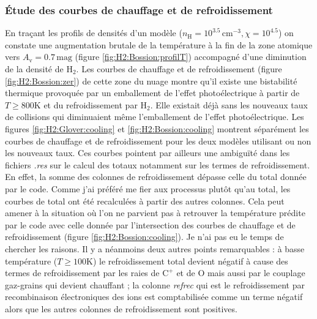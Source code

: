 \subsubsection{Étude des courbes de chauffage et de refroidissement}

En traçant les profils de densités d'un modèle ($n_\mathrm{H} = 10^{3.5}\,\mathrm{cm}^{-3},\chi = 10^{4.5}$) on constate une augmentation brutale de la température à la fin de la zone atomique vers $A_\mathrm{v}=0.7\,\mathrm{mag}$ (figure \ref{fig:H2:Bossion:profilT}) accompagné d'une diminution de la densité de $\mathrm{H}_2$. Les courbes de chauffage et de refroidissement (figure \ref{fig:H2:Bossion:zer}) de cette zone du nuage montre qu'il existe une bistabilité thermique provoquée par un emballement de l'effet photoélectrique à partir de $T\geq800$K et du refroidissement par $\mathrm{H}_2$. Elle existait déjà sans les nouveaux taux de collisions qui diminuaient même l'emballement de l'effet photoélectrique. Les figures \ref{fig:H2:Glover:cooling} et \ref{fig:H2:Bossion:cooling} montrent séparément les courbes de chauffage et de refroidissement pour les deux modèles utilisant ou non les nouveaux taux. Ces courbes pointent par ailleurs une ambiguïté dans les fichiers \textit{.res} sur le calcul des totaux notamment sur les termes de refroidissement. En effet, la somme des colonnes de refroidissement dépasse celle du total donnée par le code. Comme j'ai préféré me fier aux processus plutôt qu'au total, les courbes de total ont été recalculées à partir des autres colonnes. Cela peut amener à la situation où l'on ne parvient pas à retrouver la température prédite par le code avec celle donnée par l'intersection des courbes de chauffage et de refroidissement (figure \ref{fig:H2:Bossion:cooling}). Je n'ai pas eu le temps de chercher les raisons. Il y a néanmoins deux autres points remarquables : à basse température ($T\geq 100$K) le refroidissement total devient négatif à cause des termes de refroidissement par les raies de $\mathrm{C}^+$ et de $\mathrm{O}$ mais aussi par le couplage gaz-grains qui devient chauffant ; la colonne \textit{refrec} qui est le refroidissement par recombinaison électroniques des ions est comptabilisée comme un terme négatif alors que les autres colonnes de refroidissement sont positives. \newline


